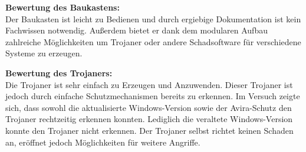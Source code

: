 \textbf{Bewertung des Baukastens: }\hfill \\
Der Baukasten ist leicht zu Bedienen und durch ergiebige Dokumentation ist kein Fachwissen notwendig.
Außerdem bietet er dank dem modularen Aufbau zahlreiche Möglichkeiten um Trojaner oder andere Schadsoftware für verschiedene Systeme zu erzeugen.

\textbf{Bewertung des Trojaners: }\hfill \\
Die Trojaner ist sehr einfach zu Erzeugen und Anzuwenden. 
Dieser Trojaner ist jedoch durch einfache Schutzmechanismen bereits zu erkennen.
Im Versuch zeigte sich, dass sowohl die aktualisierte Windows-Version sowie der Avira-Schutz den Trojaner rechtzeitig erkennen konnten.
Lediglich die veraltete Windows-Version konnte den Trojaner nicht erkennen. 
Der Trojaner selbst richtet keinen Schaden an, eröffnet jedoch Möglichkeiten für weitere Angriffe.
